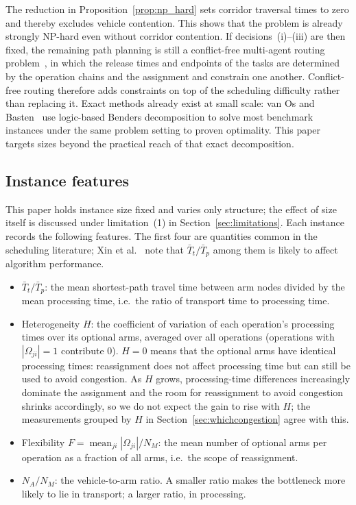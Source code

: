 \documentclass[manuscript,screen,review]{acmart}
\begin{document}
The reduction in Proposition~\ref{prop:np_hard} sets corridor traversal times to zero and thereby excludes vehicle contention. This shows that the problem is already strongly NP-hard even without corridor contention.
If decisions~(i)--(iii) are then fixed, the remaining path planning is still a conflict-free multi-agent routing problem~\cite{gao2023mapf}, in which the release times and endpoints of the tasks are determined by the operation chains and the assignment and constrain one another.
Conflict-free routing therefore adds constraints on top of the scheduling difficulty rather than replacing it. Exact methods already exist at small scale: van Os and Basten~\cite{vanos2026exact} use logic-based Benders decomposition
to solve most benchmark instances under the same problem setting to proven optimality. This paper targets sizes beyond the practical reach of that exact decomposition.

\subsection{Instance features}
\label{sec:features}

This paper holds instance size fixed and varies only structure; the effect of size itself is discussed under limitation~(1) in Section~\ref{sec:limitations}.
Each instance records the following features. The first four are quantities common in the scheduling literature; Xin et al.~\cite{xin2025review} note that $\bar{T}_t/\bar{T}_p$ among them is likely to affect algorithm performance.


\begin{itemize}[leftmargin=*,topsep=2pt,itemsep=1pt]
  \item $\bar{T}_t/\bar{T}_p$: the mean shortest-path travel time between arm nodes divided by the mean processing time, i.e.\ the ratio of transport time to processing time.
  \item Heterogeneity $H$: the coefficient of variation of each operation's processing times over its optional arms, averaged over all operations (operations with $|\Omega_{ji}|=1$ contribute $0$).
  $H=0$ means that the optional arms have identical processing times: reassignment does not affect processing time but can still be used to avoid congestion.
  As $H$ grows, processing-time differences increasingly dominate the assignment and the room for reassignment to avoid congestion shrinks accordingly, so we do not expect the gain to rise with $H$; the measurements grouped by $H$ in Section~\ref{sec:whichcongestion} agree with this.
  \item Flexibility $F=\operatorname{mean}_{ji}|\Omega_{ji}|/N_M$: the mean number of optional arms per operation as a fraction of all arms, i.e.\ the scope of reassignment.
  \item $N_A/N_M$: the vehicle-to-arm ratio. A smaller ratio makes the bottleneck more likely to lie in transport; a larger ratio, in processing.
\end{itemize}
\end{document}
